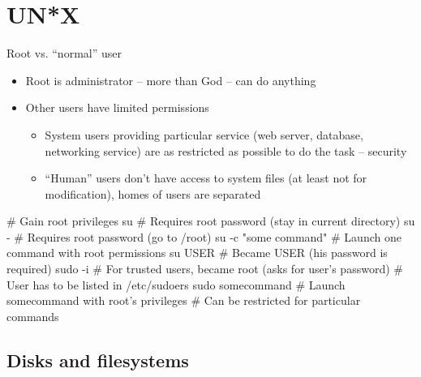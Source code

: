 \documentclass[compress, ucs, xelatex, 11pt, xcolor=svgnames,
  hyperref={
    bookmarks=true,
    unicode=true,
    colorlinks=true,
    pdftitle={Linux, command line and MetaCentrum},
    plainpages=false,
    pdfauthor={Vojtech Zeisek},
    pdfsubject={Course about use of Linux command line, writing shell scripts and using MetaCentrum of CESNET},
    pdfcreator={XeLaTeX},
    pdfkeywords={Linux, GNU, BASH, shell, command line, MetaCentrum},
    linkcolor=DarkRed,
    anchorcolor=DarkBlue,
    citecolor=Indigo,
    filecolor=NavyBlue,
    menucolor=DarkMagenta,
    urlcolor=DarkBlue,
    pdftex},
  url={hyphens, lowtilde} %
  ]{beamer}
\begin{document}
\section{UN*X}

\begin{frame}[fragile]{Root vs. ``normal'' user}
  \begin{itemize}
    \item Root is administrator -- more than God -- can do anything
    \item Other users have limited permissions
    \begin{itemize}
      \item System users providing particular service (web server, database, networking service) are as restricted as possible to do the task -- security
      \item ``Human'' users don't have access to system files (at least not for modification), homes of users are separated
    \end{itemize}
  \end{itemize}
  \begin{bashcode}
    # Gain root privileges
    su # Requires root password (stay in current directory)
    su - # Requires root password (go to /root)
    su -c "some command" # Launch one command with root permissions
    su USER # Became USER (his password is required)
    sudo -i # For trusted users, became root (asks for user's password)
            # User has to be listed in /etc/sudoers
    sudo somecommand # Launch somecommand with root's privileges
                     # Can be restricted for particular commands
  \end{bashcode}
\end{frame}

\subsection{Disks and filesystems}
\end{document}
